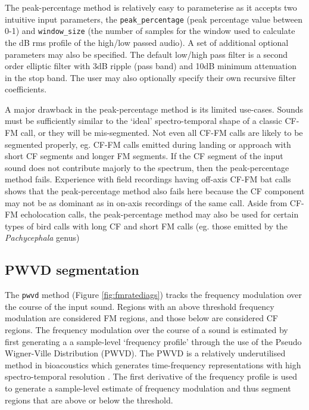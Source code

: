 \documentclass[
]{book}
\begin{document}
The peak-percentage method is relatively easy to parameterise as it accepts two intuitive input parameters, the \texttt{peak\_percentage} (peak percentage value between 0-1) and \texttt{window\_size} (the number of samples for the window used to calculate the dB rms profile of the high/low passed audio). A set of additional optional parameters may also be specified. The default low/high pass filter is a second order elliptic filter with 3dB ripple (pass band) and 10dB minimum attenuation in the stop band. The user may also optionally specify their own recursive filter coefficients.

A major drawback in the peak-percentage method is its limited use-cases. Sounds must be sufficiently similar to the `ideal' spectro-temporal shape of a classic CF-FM call, or they will be mis-segmented. Not even all CF-FM calls are likely to be segmented properly, eg. CF-FM calls emitted during landing or approach with short CF segments and longer FM segments. If the CF segment of the input sound does not contribute majorly to the spectrum, then the peak-percentage method fails. Experience with field recordings having off-axis CF-FM bat calls shows that the peak-percentage method also fails here because the CF component may not be as dominant as in on-axis recordings of the same call. Aside from CF-FM echolocation calls, the peak-percentage method may also be used for certain types of bird calls with long CF and short FM calls (eg. those emitted by the \emph{Pachycephala} genus)

\hypertarget{pwvd-segmentation}{%
\subsection{PWVD segmentation}\label{pwvd-segmentation}}

The \texttt{pwvd} method (Figure \ref{fig:fmratediags}) tracks the frequency modulation over the course of the input sound. Regions with an above threshold frequency modulation are considered FM regions, and those below are considered CF regions. The frequency modulation over the course of a sound is estimated by first generating a a sample-level `frequency profile' through the use of the Pseudo Wigner-Ville Distribution (PWVD). The PWVD is a relatively underutilised method in bioacoustics \citep[but see][]{fu2018systematic, kopsinis2010time} which generates time-frequency representations with high spectro-temporal resolution \citep{boashash2015time}. The first derivative of the frequency profile is used to generate a sample-level estimate of frequency modulation and thus segment regions that are above or below the threshold.
\end{document}
